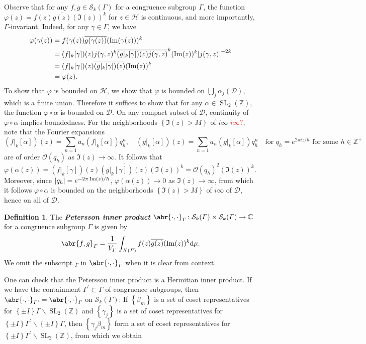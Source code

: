 \documentclass[10pt,leqno,twoside]{article}
\theoremstyle{plain}
\theoremstyle{definition}
\newtheorem{definition/}[lem]{Definition}
\newenvironment{definition}
  {\renewcommand{\qedsymbol}{\textdagger}%
   \pushQED{\qed}\begin{definition/}}
  {\popQED\end{definition/}}
\numberwithin{equation}{section}
\numberwithin{lem}{section}
\newcommand{\cbr}[1]{\left\{#1\right\}}
\newcommand{\textib}[1]{\textbf{\textit{#1\index{#1}}}} %
\DeclareMathOperator{\SL}{SL}
\newcommand{\slz}{\SL_2(\mathbb{Z})}
\newcommand{\sai}[1]{\textcolor{red}{#1}}
\begin{document}
Observe that for any $f,g\in\mathcal S_k(\varGamma)$ for a congruence subgroup $\varGamma$, the function $\varphi(z) = f(z)\overline{g(z)}(\Im(z))^k$ for $z\in\mathcal H$ is continuous, and more importantly, $\varGamma$-invariant. Indeed, for any $\gamma\in\varGamma$, we have
\begin{align*}
    \varphi(\gamma(z)) &= f(\gamma(z))\overline{g(\gamma(z))}(\Im(\gamma(z)))^k\\
    &= (f|_k[\gamma])(z)j(\gamma,z)^k\overline{(g|_k[\gamma])(z)}\overline{j(\gamma,z)}^k(\Im(z))^k\abs{j(\gamma,z)}^{-2k}\\
    &= (f|_k[\gamma])(z)\overline{(g|_k[\gamma])(z)}(\Im(z))^k\\
    &= \varphi(z).
\end{align*} To show that $\varphi$ is bounded on $\mathcal H$, we show that $\varphi$ is bounded on $\bigcup_j\alpha_j(\mathcal D)$, which is a finite union. Therefore it suffices to show that for any $\alpha\in\slz$, the function $\varphi\circ\alpha$ is bounded on $\mathcal D$. On any compact subset of $\mathcal D$, continuity of $\varphi\circ\alpha$ implies boundedness. For the neighborhoods $\cbr{\Im(z)> M}$ of $i\infty$ \sai{$i\infty$?}, note that the Fourier expansions
\[(f|_k[\alpha])(z) = \sum_{n =1}a_n(f|_k[\alpha])q_h^n,\quad (g|_k[\alpha])(z) = \sum_{n =1}a_n(g|_k[\alpha])q_h^n\quad\text{for $q_h = e^{2\pi i z /h}$ for some $h\in\mathbb Z^+$}\] are of order $\mathcal O(q_h)$ as $\Im(z)\to\infty$. It follows that $\varphi(\alpha(z)) = (f|_k[\gamma])(z)\overline{(g|_k[\gamma])(z)}(\Im(z))^k = \mathcal O(q_h)^2(\Im(z))^k$. Moreover, since $\abs{q_h} = e^{-2\pi \Im(z)/h}$, $\varphi(\alpha(z))\to 0$ as $\Im(z)\to\infty$, from which it follows $\varphi\circ\alpha$ is bounded on the neighborhoods $\cbr{\Im(z)> M}$ of $i\infty$ of $\mathcal D$, hence on all of $\mathcal D$.
\begin{definition}
    The \textib{Petersson inner product} $\abr{\cdot,\cdot}_\varGamma\colon \mathcal S_k(\varGamma)\times \mathcal S_k(\varGamma)\to\mathbb C$ for a congruence subgroup $\varGamma$ is given by 
    \[\abr{f,g}_\varGamma = \frac{1}{V_\varGamma}\int_{X(\varGamma)}f(z)\overline{g(z)}(\Im(z))^k\dd\mu.\] We omit the subscript ${}_\varGamma$ in $\abr{\cdot,\cdot}_\varGamma$ when it is clear from context.
\end{definition}
One can check that the Petersson inner product is a Hermitian inner product. If we have the containment $\varGamma^\prime\subset \varGamma$ of congruence subgroups, then $\abr{\cdot,\cdot}_{\varGamma^\prime} = \abr{\cdot,\cdot}_\varGamma$ on $\mathcal S_k(\varGamma)$: If $\cbr{\beta_m}$ is a set of coset representatives for $\cbr{\pm I}\varGamma\backslash\slz$ and $\cbr{\gamma_{j}}$ is a set of coset representatives for $\cbr{\pm I}\varGamma^\prime\backslash\cbr{\pm I}\varGamma$, then $\cbr{\gamma_j\beta_m}$ form a set of coset representatives for $\cbr{\pm I}\varGamma^\prime\backslash \slz$, from which we obtain
\end{document}
